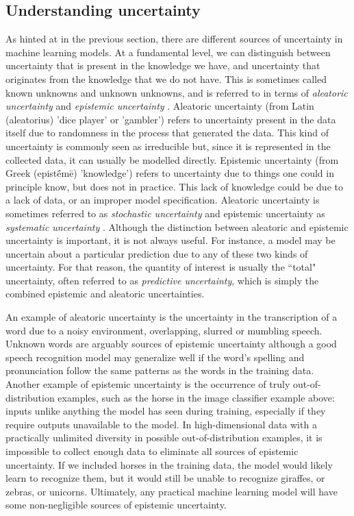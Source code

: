 \subsection{Understanding uncertainty}
% 
% 
As hinted at in the previous section, there are different sources of uncertainty in machine learning models. 
At a fundamental level, we can distinguish between uncertainty that is present in the knowledge we have, and uncertainty that originates from the knowledge that we do not have.
This is sometimes called known unknowns and unknown unknowns, and is referred to in terms of \textit{aleatoric uncertainty} and \textit{epistemic uncertainty} \cite{kendall_what_2017}. 
Aleatoric uncertainty (from Latin (aleatorius) 'dice player' or 'gambler') refers to uncertainty present in the data itself due to randomness in the process that generated the data. This kind of uncertainty is commonly seen as irreducible but, since it is represented in the collected data, it can usually be modelled directly. 
Epistemic uncertainty (from Greek (epistḗmē) 'knowledge') refers to uncertainty due to things one could in principle know, but does not in practice. This lack of knowledge could be due to a lack of data, or an improper model specification. 
Aleatoric uncertainty is sometimes referred to as \textit{stochastic uncertainty} and epistemic uncertainty as \textit{systematic uncertainty} \cite{kendall_what_2017}. 
Although the distinction between aleatoric and epistemic uncertainty is important, it is not always useful. For instance, a model may be uncertain about a particular prediction due to any of these two kinds of uncertainty. For that reason, the quantity of interest is usually the ``total" uncertainty, often referred to as \textit{predictive uncertainty}, which is simply the combined epistemic and aleatoric uncertainties. 

An example of aleatoric uncertainty is the uncertainty in the transcription of a word due to a noisy environment, overlapping, slurred or mumbling speech. 
Unknown words are arguably sources of epistemic uncertainty although a good speech recognition model may generalize well if the word's spelling and pronunciation follow the same patterns as the words in the training data. Another example of epistemic uncertainty is the occurrence of truly out-of-distribution examples, such as the horse in the image classifier example above: inputs unlike anything the model has seen during training, especially if they require outputs unavailable to the model. 
In high-dimensional data with a practically unlimited diversity in possible out-of-distribution examples, it is impossible to collect enough data to eliminate all sources of epistemic uncertainty. If we included horses in the training data, the model would likely learn to recognize them, but it would still be unable to recognize giraffes, or zebras, or unicorns. 
Ultimately, any practical machine learning model will have some non-negligible sources of epistemic uncertainty. 

